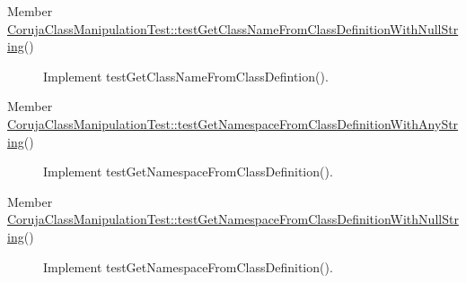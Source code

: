 \label{todo__todo000006}
\hypertarget{todo__todo000006}{}
 \begin{description}
\item[Member \hyperlink{class_coruja_class_manipulation_test_cf31c2bf27f0eb9c156d709faae15866}{CorujaClassManipulationTest::testGetClassNameFromClassDefinitionWithNullString}() ]Implement testGetClassNameFromClassDefintion(). \end{description}


\label{todo__todo000009}
\hypertarget{todo__todo000009}{}
 \begin{description}
\item[Member \hyperlink{class_coruja_class_manipulation_test_b6590619b10123f5b485b45210d3092a}{CorujaClassManipulationTest::testGetNamespaceFromClassDefinitionWithAnyString}() ]Implement testGetNamespaceFromClassDefinition(). \end{description}


\label{todo__todo000008}
\hypertarget{todo__todo000008}{}
 \begin{description}
\item[Member \hyperlink{class_coruja_class_manipulation_test_e7c02c14ae225332ea595bb2b5466ad8}{CorujaClassManipulationTest::testGetNamespaceFromClassDefinitionWithNullString}() ]Implement testGetNamespaceFromClassDefinition(). \end{description}
